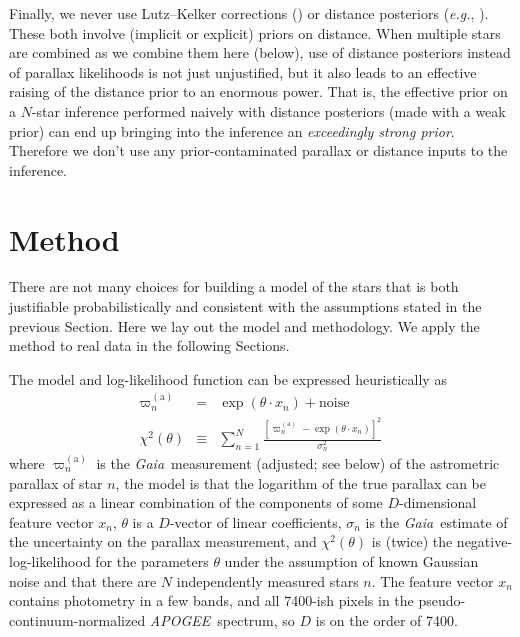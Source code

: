 \documentclass[modern]{aastex62}
\newcommand{\sectionname}{Section}
\newcommand{\foreign}[1]{\textsl{#1}}
\newcommand{\eg}{\foreign{e.g.}}
\newcommand{\acronym}[1]{{\small{#1}}}
\newcommand{\project}[1]{\textsl{#1}}
\newcommand{\apogee}{\project{\acronym{APOGEE}}}
\newcommand{\gaia}{\project{Gaia}}
\newcommand{\gparallax}{\varpi^{(\mathrm{a})}}
\begin{document}
Finally, we never use Lutz--Kelker corrections (\citealt{lk}) or distance
posteriors (\eg, \citealt{calj}). These both involve (implicit or explicit) priors on 
distance.
When multiple stars are combined as we combine them here (below),
use of distance posteriors instead of parallax likelihoods is not just
unjustified, but it also leads to an
effective raising of the distance prior to an enormous power.
That is, the effective prior on a $N$-star inference performed naively
with distance posteriors (made with a weak prior) can end up
bringing into the inference an \emph{exceedingly
strong prior}.
Therefore we don't use any prior-contaminated parallax or distance
inputs to the inference.

\section{Method}

There are not many choices
for building a model of the stars that is both justifiable probabilistically
and consistent with the assumptions stated in the previous \sectionname.
Here we lay out the model and methodology.
We apply the method to real data in the following {\sectionname s}.

The model and log-likelihood function can be expressed heuristically as
\begin{eqnarray}
\gparallax_n &=& \exp(\theta\cdot x_n) + \mbox{noise}
\\
\chi^2(\theta) &\equiv& \sum_{n=1}^N \frac{[\gparallax_n - \exp(\theta\cdot x_n)]^2}{\sigma_n^2}
\end{eqnarray}
where
$\gparallax_n$ is the \gaia\ measurement (adjusted; see below) of the astrometric parallax of star $n$,
the model is that the logarithm of the true parallax
can be expressed as a linear combination of the components
of some $D$-dimensional feature vector $x_n$,
$\theta$ is a $D$-vector of linear coefficients,
$\sigma_n$ is the \gaia\ estimate of the uncertainty on the parallax measurement,
and $\chi^2(\theta)$ is (twice) the negative-log-likelihood for the parameters $\theta$
under the assumption of known Gaussian noise and
that there are $N$ independently measured stars $n$.
The feature vector $x_n$ contains photometry in a few bands, and all 7400-ish pixels
in the pseudo-continuum-normalized \apogee\ spectrum, so $D$ is on the order of 7400.
\end{document}
